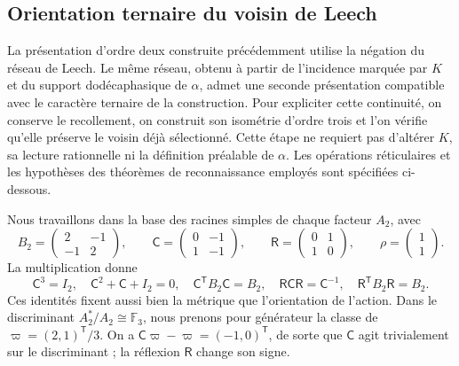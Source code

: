 \subsection{Orientation ternaire du voisin de Leech}
\label{km:orden-tres-reticular}

La présentation d’ordre deux construite précédemment utilise la négation
du réseau de Leech. Le même réseau, obtenu à partir de l’incidence marquée
par \(K\) et du support dodécaphasique de \(\alpha\), admet une seconde
présentation compatible avec le caractère ternaire de la construction.
Pour expliciter cette continuité, on conserve le recollement, on construit
son isométrie d’ordre trois et l’on vérifie qu’elle préserve le voisin déjà
sélectionné. Cette étape ne requiert pas d’altérer \(K\), sa lecture rationnelle ni
la définition préalable de \(\alpha\). Les opérations réticulaires et les
hypothèses des théorèmes de reconnaissance employés sont spécifiées
ci-dessous.

Nous travaillons dans la base des racines simples de chaque facteur \(A_2\), avec
\begin{equation}
 B_2=\begin{pmatrix}2&-1\\-1&2\end{pmatrix},\qquad
 \mathsf C=\begin{pmatrix}0&-1\\1&-1\end{pmatrix},\qquad
 \mathsf R=\begin{pmatrix}0&1\\1&0\end{pmatrix},\qquad
 \rho=\begin{pmatrix}1\\1\end{pmatrix}.
 \label{km:coxeter-reflexion}
\end{equation}
La multiplication donne
\[
 \mathsf C^3=I_2,\quad
 \mathsf C^2+\mathsf C+I_2=0,\quad
 \mathsf C^{\mathsf T}B_2\mathsf C=B_2,\quad
 \mathsf R\mathsf C\mathsf R=\mathsf C^{-1},\quad
 \mathsf R^{\mathsf T}B_2\mathsf R=B_2.
\]
Ces identités fixent aussi bien la métrique que l'orientation de l'action. Dans le discriminant \(A_2^*/A_2\cong\mathbb F_3\), nous prenons pour générateur la classe de \(\varpi=(2,1)^{\mathsf T}/3\). On a \(\mathsf C\varpi-\varpi=(-1,0)^{\mathsf T}\), de sorte que \(\mathsf C\) agit trivialement sur le discriminant ; la réflexion \(\mathsf R\) change son signe.

